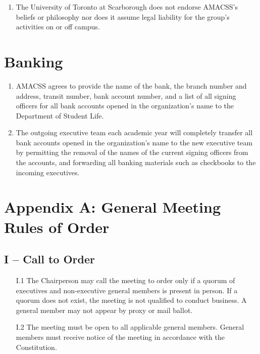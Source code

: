 \documentclass[12pt,a4paper]{article}
\begin{document}
\begin{enumerate}
\item The University of Toronto at Scarborough does not endorse AMACSS's beliefs or philosophy nor does it assume legal liability for the group's activities on or off campus.
\end{enumerate}

\section{Banking}

\begin{enumerate}
\item AMACSS agrees to provide the name of the bank, the branch number and address, transit number, bank account number, and a list of all signing officers for all bank accounts opened in the organization's name to the Department of Student Life.

\item The outgoing executive team each academic year will completely transfer all bank accounts opened in the organization's name to the new executive team by permitting the removal of the names of the current signing officers from the accounts, and forwarding all banking materials such as checkbooks to the incoming executives.
\end{enumerate}

\section*{Appendix A: General Meeting Rules of Order}

\subsection*{I – Call to Order}
 
 
\begin{enumerate}
\item[I.1] The Chairperson may call the meeting to order only if a quorum of executives and non-executive general members is present in person. If a quorum does not exist, the meeting is not qualified to conduct business. A general member may not appear by proxy
or mail ballot.

\item[I.2] The meeting must be open to all applicable general members. General members must receive notice of the meeting in accordance with the Constitution.
\end{enumerate}
\end{document}
